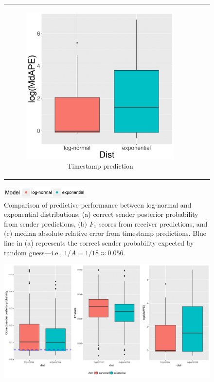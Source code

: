 \documentclass[ba]{imsart}
\numberwithin{equation}{section}
\theoremstyle{plain}
\begin{document}
\begin{figure}[!t]
\begin{tabular}[t]{ccc}
\begin{subfigure}[b]{0.33\textwidth}
				\end{subfigure}
				\begin{subfigure}[b]{0.33\textwidth}
					\caption{Timestamp prediction}
					\includegraphics[width=\textwidth]{img/timepredict-1.png}	
				\end{subfigure}
			\end{tabular}
				\includegraphics[width=0.4\textwidth]{img/modellabel.png}				
			\caption {Comparison of predictive performance between log-normal and exponential distributions: (a) correct sender posterior probability from sender predictions, (b) $F_1$ scores from receiver predictions, and (c) median absolute relative error from timestamp predictions. Blue line in (a) represents the correct sender probability expected by random guess---i.e., $1/A=1/18\approx0.056$.}
			\label{figure:PPEresults}
		\end{figure}		
		\iffalse
				\begin{figure}[!t]
				\centering
				\includegraphics[width=1\textwidth]{img/PPEplotnew-1.png}	
			\end{figure}
\end{document}
